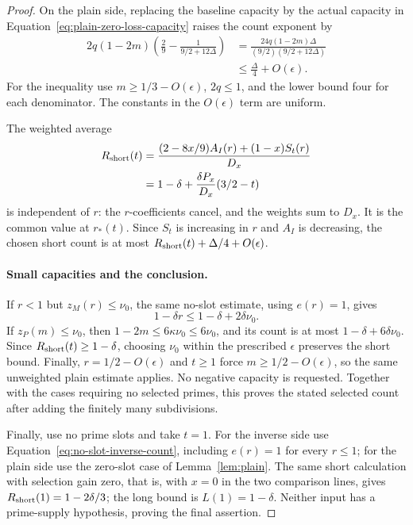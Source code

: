\documentclass[11pt,a4paper]{article}
\numberwithin{equation}{section}
\numberwithin{figure}{section}
\theoremstyle{definition}
\theoremstyle{remark}
\begin{document}
\begin{proof}
On the plain side, replacing the baseline capacity by the actual
capacity in Equation~\eqref{eq:plain-zero-loss-capacity} raises
the count exponent by
\begin{equation}
 \begin{split}
 2q(1-2m)
 \left(\frac29-\frac1{9/2+12\Delta}\right)
 &=\frac{24q(1-2m)\Delta}{(9/2)(9/2+12\Delta)}\\
 &\le\frac{\Delta}{4}+O(\epsilon).
 \end{split}
 \label{eq:capacity-comparison}
\end{equation}
For the inequality use \(m\ge1/3-O(\epsilon)\), \(2q\le1\),
and the lower bound four for each denominator.  The constants in
the \(O(\epsilon)\) term are uniform.

The weighted average
\begin{equation}
 \begin{aligned}
 R_{\rm short}(t)
 &=\frac{(2-8x/9)A_I(r)+(1-x)S_t(r)}{D_x}\\
 &=1-\delta+\frac{\delta P_x}{D_x}(3/2-t)
 \end{aligned}
 \label{eq:short-crossing-count}
\end{equation}
is independent of \(r\): the \(r\)-coefficients cancel, and the
weights sum to \(D_x\).  It is the common value at \(r_*(t)\).
Since \(S_t\) is increasing in \(r\) and \(A_I\) is decreasing,
the chosen short count is at most \(R_{\rm short}(t)+\Delta/4+O(\epsilon)\).

\paragraph{Small capacities and the conclusion.}
If \(r<1\) but \(z_M(r)\le\nu_0\), the same no-slot estimate,
using \(e(r)=1\), gives
\[
 1-\delta r\le1-\delta+2\delta\nu_0.
\]
If \(z_P(m)\le\nu_0\), then
\(1-2m\le6\kappa\nu_0\le6\nu_0\), and its count is at most
\(1-\delta+6\delta\nu_0\).  Since \(R_{\rm short}(t)\ge1-\delta\),
choosing \(\nu_0\) within the prescribed \(\epsilon\) preserves
the short bound.  Finally, \(r=1/2-O(\epsilon)\) and \(t\ge1\)
force \(m\ge1/2-O(\epsilon)\), so the same unweighted plain
estimate applies.  No negative capacity is requested.
Together with the cases requiring no selected primes, this proves the stated selected
count after adding the finitely many subdivisions.

Finally, use no prime slots and take \(t=1\).  For the inverse
side use Equation~\eqref{eq:no-slot-inverse-count}, including
\(e(r)=1\) for every \(r\le1\); for the plain side use the
zero-slot case of Lemma~\ref{lem:plain}.  The same short calculation
with selection gain zero, that is, with \(x=0\) in the two comparison
lines, gives \(R_{\rm short}(1)=1-2\delta/3\); the long bound is
\(L(1)=1-\delta\).  Neither input has a prime-supply hypothesis,
proving the final assertion.
\end{proof}
\end{document}
